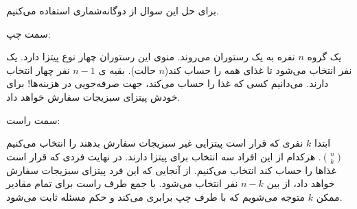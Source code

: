 \documentclass[12pt,onecolumn,a4paper]{article}
\begin{document}
برای حل این سوال از دوگانه‌شماری استفاده می‌کنیم.

سمت چپ: 

یک گروه $n$ نفره به یک رستوران می‌روند. منوی این رستوران چهار نوع پیتزا دارد.  یک نفر انتخاب می‌شود تا غذای همه را حساب کند($n$ حالت). بقیه ی $n-1$ نفر چهار انتخاب دارند. می‌دانیم کسی که غذا را حساب می‌کند، جهت صرفه‌جویی در هزینه‌ها! برای خودش پیتزای سبزیجات سفارش خواهد داد.

سمت راست:

ابتدا $k$ نفری که قرار است پیتزایی غیر سبزیجات سفارش بدهند را انتخاب می‌کنیم 
$\binom{n}{k}$.
هرکدام از این افراد سه انتخاب برای پیتزا دارند. در نهایت فردی که قرار است غذاها را حساب کند انتخاب می‌کنیم. از آنجایی که این فرد پیتزای سبزیجات سفارش خواهد داد، از بین $n-k$ نفر انتخاب می‌شود. با جمع طرف راست برای تمام مقادیر ممکن $k$ متوجه می‌شویم که با طرف چپ برابری می‌کند و حکم مسئله ثابت می‌شود.
\end{document}
